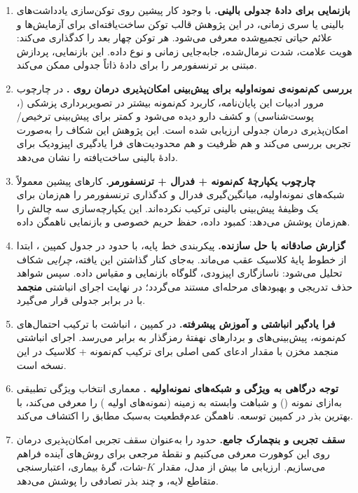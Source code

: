 \begin{enumerate}
\item \textbf{بازنمایی  برای دادۀ جدولی بالینی.} با وجود کار پیشین روی توکن‌سازی یادداشت‌های بالینی یا سری زمانی، در این پژوهش قالب توکن ساخت‌یافته‌ای برای آزمایش‌ها و علائم حیاتی تجمیع‌شده معرفی می‌شود. هر توکن چهار بعد را کدگذاری می‌کند: هویت علامت، شدت نرمال‌شده، جابه‌جایی زمانی و نوع داده. این بازنمایی، پردازش مبتنی بر ترنسفورمر را برای دادۀ ذاتاً جدولی ممکن می‌کند.

\item \textbf{بررسی کم‌نمونه‌ی نمونه‌اولیه برای پیش‌بینی امکان‌پذیری درمان روی .} در چارچوب مرور ادبیات این پایان‌نامه، کاربرد کم‌نمونه بیشتر در تصویربرداری پزشکی (، پوست‌شناسی) و کشف دارو دیده می‌شود و کمتر برای پیش‌بینی ترخیص/امکان‌پذیری درمان  جدولی ارزیابی شده است. این پژوهش این شکاف را به‌صورت تجربی بررسی می‌کند و هم ظرفیت و هم محدودیت‌های فرا یادگیری اپیزودیک برای دادۀ بالینی ساخت‌یافته را نشان می‌دهد.

\item \textbf{چارچوب یکپارچۀ کم‌نمونه + فدرال + ترنسفورمر.} کارهای پیشین معمولاً شبکه‌های نمونه‌اولیه، میانگین‌گیری فدرال و کدگذاری ترنسفورمر را هم‌زمان برای یک وظیفۀ پیش‌بینی بالینی ترکیب نکرده‌اند. این یکپارچه‌سازی سه چالش را هم‌زمان پوشش می‌دهد: کمبود داده، حفظ حریم خصوصی و بازنمایی ناهمگن داده.

\item \textbf{گزارش صادقانه با حل سازنده.} پیکربندی خط پایه، با  حدود  در جدول کمپین ، ابتدا از خطوط پایۀ کلاسیک عقب می‌ماند. به‌جای کنار گذاشتن این یافته، \emph{چرایی} شکاف تحلیل می‌شود: ناسازگاری اپیزودی، گلوگاه بازنمایی و مقیاس داده. سپس شواهد حذف تدریجی و بهبودهای مرحله‌ای مستند می‌گردد؛ در نهایت اجرای انباشتی \textbf{منجمد} با  \textbf{} در برابر  جدولی \textbf{} قرار می‌گیرد.

\item \textbf{فرا یادگیر انباشتی و آموزش پیشرفته.} در کمپین ، انباشت  با ترکیب احتمال‌های کم‌نمونه، پیش‌بینی‌های  و بردارهای نهفتۀ رمزگذار به  برابر  می‌رسد. اجرای انباشتی منجمد مخزن \texttt{} با مقدار \textbf{} ادعای کمی اصلی برای ترکیب کم‌نمونه + کلاسیک در این نسخه است.

\item \textbf{توجه درگاهی به ویژگی و شبکه‌های نمونه‌اولیه .} معماری  انتخاب ویژگی تطبیقی به‌ازای نمونه () و شباهت وابسته به زمینه (نمونه‌های اولیه ) را معرفی می‌کند، با بهترین بذر   در کمپین توسعه.  ناهمگن  عدم‌قطعیت به‌سبک مطابق را اکتشاف می‌کند.

\item \textbf{سقف تجربی و بنچمارک جامع.}  حدود  را به‌عنوان سقف تجربی امکان‌پذیری درمان روی این کوهورت معرفی می‌کنیم و نقطۀ مرجعی برای روش‌های آینده فراهم می‌سازیم. ارزیابی ما بیش از  مدل،  مقدار $K$-شات،  گرۀ بیماری، اعتبارسنجی متقاطع ‌لایه، و چند بذر تصادفی را پوشش می‌دهد.
\end{enumerate}

